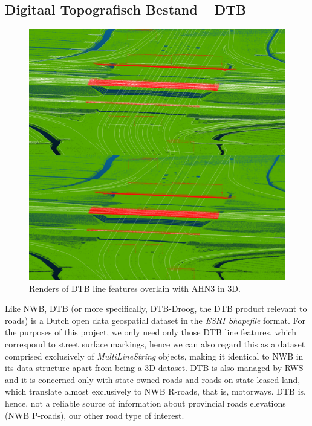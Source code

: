 \subsection{Digitaal Topografisch Bestand – DTB}
\label{sub:dtb}

\begin{figure}[h!]
    \centering
    \includegraphics[width=0.95\linewidth]{final_report/figs/ahn_sample_10.png} 
    \caption{Renders of DTB line features overlain with AHN3 in 3D.}
    \label{fig:dtbahn}
\end{figure}

Like NWB, DTB (or more specifically, DTB-Droog, the DTB product relevant to roads) is a Dutch open data geospatial dataset in the \textit{ESRI Shapefile} format. For the purposes of this project, we only need only those DTB line features, which correspond to street surface markings, hence we can also regard this as a dataset comprised exclusively of \textit{MultiLineString} objects, making it identical to NWB in its data structure apart from being a 3D dataset. DTB is also managed by RWS and it is concerned only with state-owned roads and roads on state-leased land, which translate almost exclusively to NWB R-roads, that is, motorways. DTB is, hence, not a reliable source of information about provincial roads elevations (NWB P-roads), our other road type of interest.


